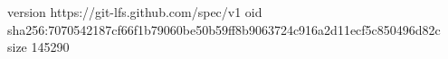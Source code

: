 version https://git-lfs.github.com/spec/v1
oid sha256:7070542187cf66f1b79060be50b59ff8b9063724c916a2d11ecf5c850496d82c
size 145290
